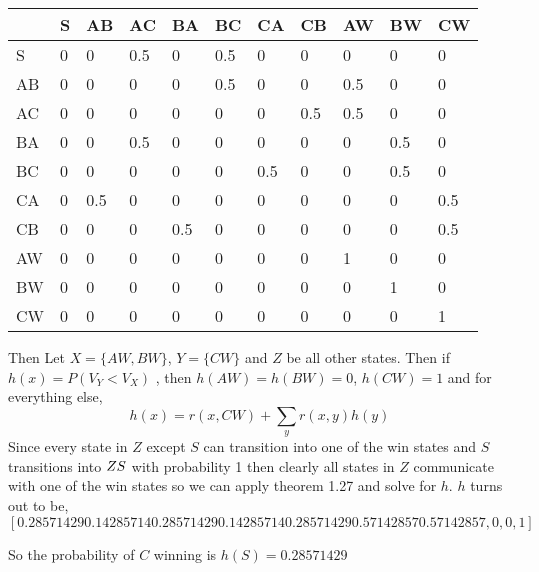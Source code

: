 \documentclass{article}
\begin{document}
\begin{tabular}{|l|l|l|l|l|l|l|l|l|l|l|}
\hline
   & S & AB  & AC  & BA  & BC  & CA  & CB  & AW  & BW  & CW  \\ 
   \hline
S  & 0 & 0   & 0.5 & 0   & 0.5 & 0   & 0   & 0   & 0   & 0   \\ 
\hline
AB & 0 & 0   & 0   & 0   & 0.5 & 0   & 0   & 0.5 & 0   & 0   \\ 
\hline
AC & 0 & 0   & 0   & 0   & 0   & 0   & 0.5 & 0.5 & 0   & 0   \\ 
\hline
BA & 0 & 0   & 0.5 & 0   & 0   & 0   & 0   & 0   & 0.5 & 0   \\ 
\hline
BC & 0 & 0   & 0   & 0   & 0   & 0.5 & 0   & 0   & 0.5 & 0   \\ 
\hline
CA & 0 & 0.5 & 0   & 0   & 0   & 0   & 0   & 0   & 0   & 0.5 \\ 
\hline
CB & 0 & 0   & 0   & 0.5 & 0   & 0   & 0   & 0   & 0   & 0.5 \\ 
\hline
AW & 0 & 0   & 0   & 0   & 0   & 0   & 0   & 1   & 0   & 0   \\ 
\hline
BW & 0 & 0   & 0   & 0   & 0   & 0   & 0   & 0   & 1   & 0   \\ 
\hline
CW & 0 & 0   & 0   & 0   & 0   & 0   & 0   & 0   & 0   & 1 \\ \hline
\end{tabular}

Then Let $X = \{AW, BW\}$, $Y = \{CW\}$ and $Z$ be all other states. 
Then if $h(x) = P(V_Y < V_X)$ , then $h(AW) = h(BW) = 0$, $h(CW) = 1$ and for everything else,
\[
h(x) = r(x,CW) + \sum_y r(x,y)h(y)
\]
Since every state in $Z$ except $S$ can transition into one of the win states and $S$ transitions into $Z \\ S$ with probability 1 then clearly all states in $Z$ communicate with one of the win states so we can apply theorem 1.27 and solve for $h$.
$h$ turns out to be,
\[
[ 0.28571429  0.14285714  0.28571429  0.14285714  0.28571429  0.57142857
  0.57142857, 0, 0, 1]
  \]
  
So the probability of $C$ winning is $h(S) = 0.28571429$
\end{document}
